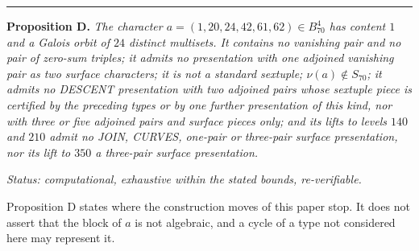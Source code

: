 \documentclass[10pt,twocolumn]{article}
\newenvironment{jbox}{\par\vspace{2pt}\noindent\color{accent}\rule{\columnwidth}{0.8pt}\par\vspace{-2pt}\small}{\par\vspace{2pt}}
\begin{document}
\begin{jbox}
\color{black}
\textbf{Proposition D.} \textit{The character $a=(1,20,24,42,61,62)\in B^4_{70}$ has content $1$ and a Galois orbit of $24$ distinct multisets. It contains no vanishing pair and no pair of zero-sum triples; it admits no presentation with one adjoined vanishing pair as two surface characters; it is not a standard sextuple; $\nu(a)\notin S_{70}$; it admits no DESCENT presentation with two adjoined pairs whose sextuple piece is certified by the preceding types or by one further presentation of this kind, nor with three or five adjoined pairs and surface pieces only; and its lifts to levels $140$ and $210$ admit no JOIN, CURVES, one-pair or three-pair surface presentation, nor its lift to $350$ a three-pair surface presentation.}\par\smallskip
\textit{Status: computational, exhaustive within the stated bounds, re-verifiable.}
\end{jbox}

Proposition D states where the construction moves of this paper stop. It
does not assert that the block of \(a\) is not algebraic, and a cycle of
a type not considered here may represent it.
\end{document}
